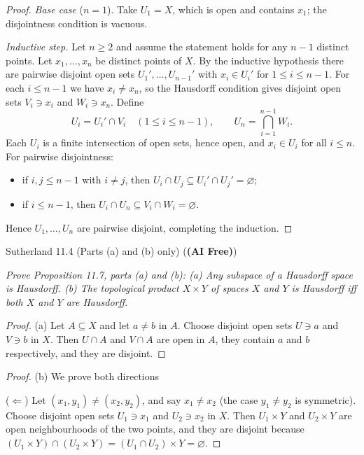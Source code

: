 \documentclass[minion]{homework}
\begin{document}
\begin{problems}
\begin{proof}
\emph{Base case} ($n = 1$). Take $U_1 = X$, which is open and contains $x_1$; the disjointness condition is vacuous.

\emph{Inductive step.} Let $n \geq 2$ and assume the statement holds for any $n-1$ distinct points. Let $x_1, \dots, x_n$ be distinct points of $X$. By the inductive hypothesis there are pairwise disjoint open sets $U_1', \dots, U_{n-1}'$ with $x_i \in U_i'$ for $1 \le i \le n-1$. For each $i \le n-1$ we have $x_i \neq x_n$, so the Hausdorff condition gives disjoint open sets $V_i \ni x_i$ and $W_i \ni x_n$. Define
\[
U_i = U_i' \cap V_i \quad (1 \le i \le n-1), \qquad U_n = \bigcap_{i=1}^{n-1} W_i .
\]
Each $U_i$ is a finite intersection of open sets, hence open, and $x_i \in U_i$ for all $i \le n$. For pairwise disjointness:
\begin{itemize}
  \item if $i, j \le n-1$ with $i \neq j$, then $U_i \cap U_j \subseteq U_i' \cap U_j' = \varnothing$;
  \item if $i \le n-1$, then $U_i \cap U_n \subseteq V_i \cap W_i = \varnothing$.
\end{itemize}
Hence $U_1, \dots, U_n$ are pairwise disjoint, completing the induction.
\end{proof}

\problem Sutherland 11.4 (Parts (a) and (b) only) (\textbf{(AI Free)})

\textit{Prove Proposition 11.7, parts (a) and (b):
(a) Any subspace of a Hausdorff space is Hausdorff.
(b) The topological product $X \times Y$ of spaces $X$ and $Y$ is Hausdorff iff both $X$ and $Y$ are Hausdorff.}

\begin{proof}
  (a) Let $A \subseteq X$ and let $a \neq b$ in $A$. Choose disjoint open sets $U \owns a$ and $V \owns b$ in $X$.
  Then $U \cap A$ and $V \cap A$ are open in $A$, they contain $a$ and $b$ respectively, and they are disjoint.
\end{proof}
\begin{proof}
  (b) We prove both directions \newline

  ($\Leftarrow$) Let $(x_1, y_1) \ne (x_2, y_2)$, and say $x_1 \ne x_2$ (the case $y_1 \ne y_2$ is symmetric). Choose disjoint open sets $U_1 \ni x_1$ and $U_2 \ni x_2$ in $X$. Then $U_1 \times Y$ and $U_2 \times Y$ are open neighbourhoods of the two points, and they are disjoint because $(U_1 \times Y) \cap (U_2 \times Y) = (U_1 \cap U_2) \times Y = \varnothing$.


\end{proof}
\end{problems}
\end{document}
